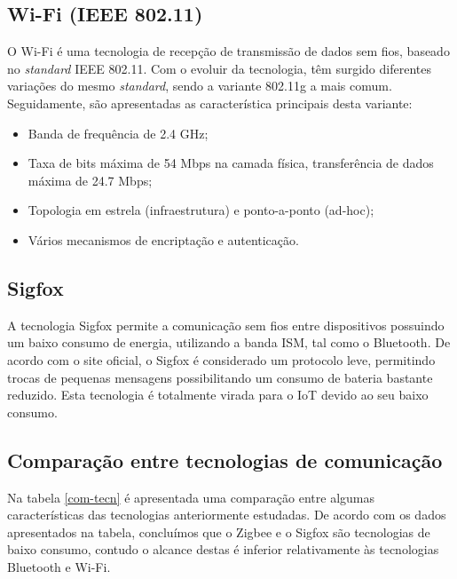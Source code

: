 \subsection{Wi-Fi (IEEE 802.11)}


O Wi-Fi é uma tecnologia de recepção de transmissão de dados sem fios, baseado no \textit{standard} IEEE 802.11. Com o evoluir da tecnologia, têm surgido diferentes variações do mesmo \textit{standard}, sendo a variante 802.11g a mais comum. Seguidamente, são apresentadas as característica principais desta variante\cite{Paper2005}\cite{urlwifi}:


\begin{itemize}
	\item Banda de frequência de 2.4 GHz;
	\item Taxa de bits máxima de 54 Mbps na camada física, transferência de dados máxima de 24.7 Mbps;
	\item Topologia em estrela (infraestrutura) e ponto-a-ponto (ad-hoc);
	\item Vários mecanismos de encriptação e autenticação.
\end{itemize}







\subsection{Sigfox}


A tecnologia Sigfox permite a comunicação sem fios entre dispositivos possuindo um baixo consumo de energia, utilizando a banda \ac{ISM}, tal como o Bluetooth. De acordo com o site oficial, o Sigfox é considerado um protocolo leve, permitindo trocas de pequenas mensagens possibilitando um consumo de bateria bastante reduzido\cite{sigfoxsite}. Esta tecnologia é totalmente virada para o \ac{IoT} devido ao seu baixo consumo. 




\subsection{Comparação entre tecnologias de comunicação}

Na tabela \ref{com-tecn} é apresentada uma comparação entre algumas características das tecnologias anteriormente estudadas. De acordo com os dados apresentados na tabela, concluímos que o Zigbee e o Sigfox são tecnologias de baixo consumo, contudo o alcance destas é inferior relativamente às tecnologias Bluetooth e Wi-Fi. 




